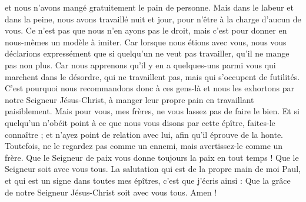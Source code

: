 \begin{multicols}{2}
et nous n'avons mangé gratuitement le pain de personne. Mais dans le labeur et dans la peine, nous avons travaillé nuit et jour, pour n'être à la charge d'aucun de vous.
Ce n'est pas que nous n'en ayons pas le droit, mais c'est pour donner en nous-mêmes un modèle à imiter.
Car lorsque nous étions avec vous, nous vous déclarions expressément que si quelqu'un ne veut pas travailler, qu'il ne mange pas non plus.
Car nous apprenons qu'il y en a quelques-uns parmi vous qui marchent dans le désordre, qui ne travaillent pas, mais qui s'occupent de futilités.
C'est pourquoi nous recommandons donc à ces gens-là et nous les exhortons par notre Seigneur Jésus-Christ, à manger leur propre pain en travaillant paisiblement.
Mais pour vous, mes frères, ne vous lassez pas de faire le bien.
Et si quelqu'un n'obéit point à ce que nous vous disons par cette épître, faites-le connaître ; et n'ayez point de relation avec lui, afin qu'il éprouve de la honte.
Toutefois, ne le regardez pas comme un ennemi, mais avertissez-le comme un frère.
Que le Seigneur de paix vous donne toujours la paix en tout temps ! Que le Seigneur soit avec vous tous.
La salutation qui est de la propre main de moi Paul, et qui est un signe dans toutes mes épîtres, c'est que j'écris ainsi :
Que la grâce de notre Seigneur Jésus-Christ soit avec vous tous. Amen !
\PPE{}
\end{multicols}
